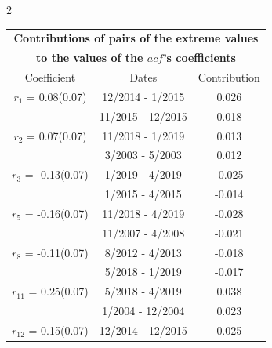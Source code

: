 
\thispagestyle{empty}
\begin{multicols}{2}{ 
\begin{tabular}{ccc}
\multicolumn{3}{c}{\textbf{Contributions of pairs of the extreme values} }  \vspace{-.10in}  \\ 
\multicolumn{3}{c}{ \textbf{to the values of the $acf$'s coefficients}} \\ 
\hline 
\hline                  Coefficient  &  Dates &  Contribution \\ 
\hline 
  $r_{ 1}$ = 0.08(0.07) &      12/2014 -  1/2015 &        0.026   \vspace{-.10in} \\  
&       11/2015 - 12/2015 &        0.018  \vspace{-.02in} \\ \hline 
  $r_{ 2}$ = 0.07(0.07) &      11/2018 -  1/2019 &        0.013   \vspace{-.10in} \\  
&        3/2003 -  5/2003 &        0.012  \vspace{-.02in} \\ \hline 
  $r_{ 3}$ = -0.13(0.07) &       1/2019 -  4/2019 &       -0.025    \vspace{-.10in} \\ 
  &        1/2015 -  4/2015 &       -0.014  \vspace{-.02in}   \\ \hline 
    $r_{ 5}$ = -0.16(0.07) &      11/2018 -  4/2019 &       -0.028    \vspace{-.10in} \\ 
  &       11/2007 -  4/2008 &       -0.021  \vspace{-.02in}   \\ \hline 
    $r_{ 8}$ = -0.11(0.07) &       8/2012 -  4/2013 &       -0.018    \vspace{-.10in} \\ 
  &        5/2018 -  1/2019 &       -0.017  \vspace{-.02in}   \\ \hline 
    $r_{11}$ = 0.25(0.07) &       5/2018 -  4/2019 &        0.038   \vspace{-.10in} \\  
&        1/2004 - 12/2004 &        0.023  \vspace{-.02in} \\ \hline 
  $r_{12}$ = 0.15(0.07) &      12/2014 - 12/2015 &        0.025   \vspace{-.10in} \\  

\end{tabular}}
\end{multicols}
